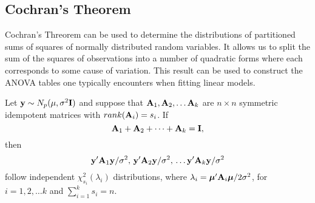\subsection{Cochran's Theorem}
Cochran's Threorem can be used to determine the distributions of partitioned sums of squares of normally distributed random variables.  It allows us to split the sum of the squares of observations into a number of quadratic forms where each corresponds to some cause of variation. This result can be used to construct  the ANOVA tables one typically encounters when fitting linear models.

\bstheo
Let $\mathbf{y} \sim N_p(\mu, \sigma^2 \mathbf{I})$ and suppose that $\mathbf{A}_1, \mathbf{A}_2, \ldots \mathbf{A}_k$ are $n \times n$ symmetric idempotent matrices with $rank(\mathbf{A}_i) = s_i$. If 
$$\mathbf{A}_1 + \mathbf{A}_2 + \cdots + \mathbf{A}_k = \mathbf{I},$$ then $$\mathbf{y}' \mathbf{A}_1 \mathbf{y}/\sigma^2, \,  \mathbf{y}' \mathbf{A}_2 \mathbf{y}/\sigma^2, \, \ldots  \mathbf{y}' \mathbf{A}_k \mathbf{y}/\sigma^2$$ follow independent $\chi^2_{s_i}(\lambda_i)$ distributions, where  $\lambda_i = \mbox{\boldmath $\mu$}' \mathbf{A}_i \mbox{\boldmath $\mu$}/{2\sigma^2}$, for $i=1,2,\ldots k$ and $\sum_{i=1}^k s_i = n$.
\estheo



